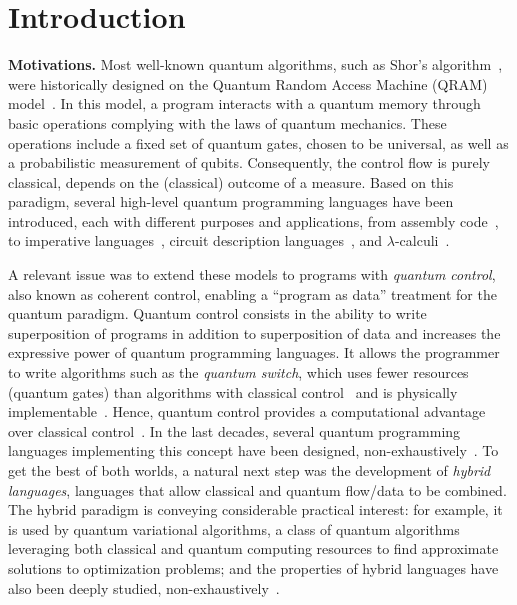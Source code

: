 \section{Introduction}
\label{sec:intro}

\textbf{Motivations. }
Most well-known quantum algorithms, such as Shor's algorithm~\cite{Sho97}, were
historically designed on the Quantum Random Access Machine (QRAM)
model~\cite{Kni22}. In this model, a program
interacts with a quantum memory through basic operations complying with the
laws of quantum mechanics. These operations include a fixed set of quantum
gates, chosen to be universal, as well as a probabilistic measurement of
qubits. Consequently, the control flow is purely classical, \ie depends on the
(classical) outcome of a measure. Based on  this paradigm, several high-level
quantum programming languages have been introduced, each with different
purposes and applications, from assembly code~\cite{QASM17,QASM22}, to
imperative languages~\cite{FY21}, circuit description languages~\cite{GLRSV13},
and $\lambda$-calculi~\cite{SV09}.

A relevant issue was to extend these models to programs with \emph{quantum
control}, also known as coherent control, enabling a ``program as data''
treatment for the quantum paradigm. Quantum control consists in the ability to
write superposition of programs in addition to superposition of data and
increases the expressive power of quantum programming languages. It allows the
programmer to write algorithms such as the \emph{quantum switch}, which uses
fewer resources (quantum gates) than algorithms with classical
control~\cite{CAPV13} and is physically implementable~\cite{AWHM20,PMA+15}.
Hence, quantum control provides a computational advantage over classical
control~\cite{ACB14,TCM+21,KOY24}. In the last decades, several  quantum
programming languages implementing this concept have been designed,
non-exhaustively~\cite{AG05,SVV18,DCM22,Lem24, YVC24}. To get the best of both worlds,
a natural next step was the development of \emph{hybrid languages}, \ie
languages that allow classical and quantum flow/data to be combined.
The hybrid paradigm is conveying considerable practical interest: for example,
it is used by quantum variational algorithms, a class of quantum algorithms
leveraging both classical and quantum computing resources to find approximate
solutions to optimization problems; and the properties of hybrid languages have
also been deeply studied, non-exhaustively~\cite{Qunity23,Yin24,DLPZ25,BPP25}.

